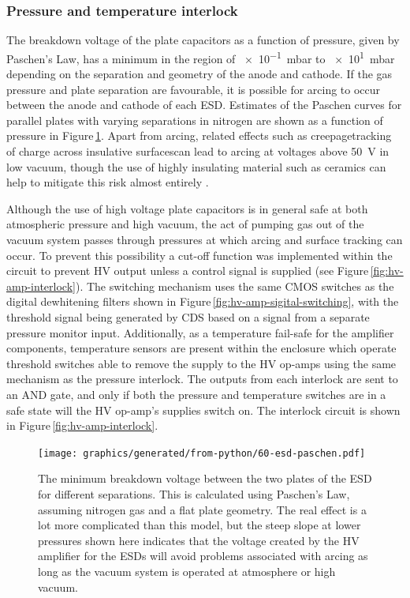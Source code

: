 \subsubsection{Pressure and temperature interlock}
The breakdown voltage of the plate capacitors as a function of pressure, given by Paschen's Law, has a minimum in the region of \SI{e-1}{\milli\bar} to \SI{e1}{\milli\bar} depending on the separation and geometry of the anode and cathode. If the gas pressure and plate separation are favourable, it is possible for arcing to occur between the anode and cathode of each \gls{ESD}. Estimates of the Paschen curves for parallel plates with varying separations in nitrogen are shown as a function of pressure in Figure\,\ref{fig:esd-paschen}. Apart from arcing, related effects such as creepage\textemdash tracking of charge across insulative surfaces\textemdash can lead to arcing at voltages above \SI{50}{\volt} in low vacuum, though the use of highly insulating material such as ceramics can help to mitigate this risk almost entirely \cite{EN2010}.

Although the use of high voltage plate capacitors is in general safe at both atmospheric pressure and high vacuum, the act of pumping gas out of the vacuum system passes through pressures at which arcing and surface tracking can occur. To prevent this possibility a cut-off function was implemented within the circuit to prevent \gls{HV} output unless a control signal is supplied (see Figure\,\ref{fig:hv-amp-interlock}). The switching mechanism uses the same \gls{CMOS} switches as the digital dewhitening filters shown in Figure\,\ref{fig:hv-amp-sigital-switching}, with the threshold signal being generated by \gls{CDS} based on a signal from a separate pressure monitor input. Additionally, as a temperature fail-safe for the amplifier components, temperature sensors are present within the enclosure which operate threshold switches able to remove the supply to the \gls{HV} op-amps using the same mechanism as the pressure interlock. The outputs from each interlock are sent to an AND gate, and only if both the pressure and temperature switches are in a safe state will the \gls{HV} op-amp's supplies switch on. The interlock circuit is shown in Figure\,\ref{fig:hv-amp-interlock}.

\begin{figure}
  \centering
  \texttt{[image: graphics/generated/from-python/60-esd-paschen.pdf]}
  \caption[Minimum breakdown voltage between the two plates of the electrostatic drive for different separations]{\label{fig:esd-paschen}The minimum breakdown voltage between the two plates of the \gls{ESD} for different separations. This is calculated using Paschen's Law, assuming nitrogen gas and a flat plate geometry. The real effect is a lot more complicated than this model, but the steep slope at lower pressures shown here indicates that the voltage created by the \gls{HV} amplifier for the \glspl{ESD} will avoid problems associated with arcing as long as the vacuum system is operated at atmosphere or high vacuum.}
\end{figure}

